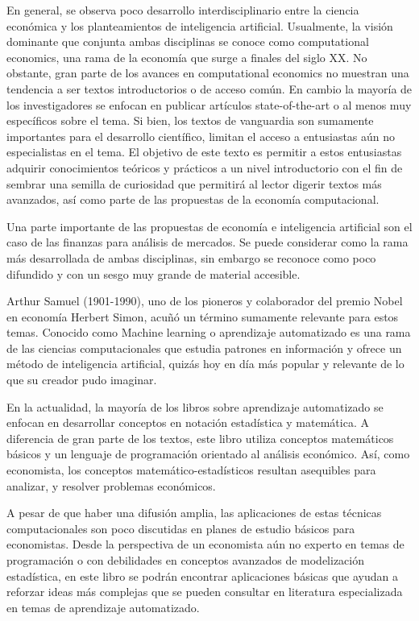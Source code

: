 \documentclass[letterpaper,12pt, spanish, oneside]{book} %
\begin{document}
En general, se observa poco desarrollo interdisciplinario entre la ciencia económica y los planteamientos de inteligencia artificial. Usualmente, la visión dominante que conjunta ambas disciplinas se conoce como computational economics, una rama de la economía que surge a finales del siglo XX. No obstante, gran parte de los avances en computational economics no muestran una tendencia a ser textos introductorios o de acceso común. En cambio la mayoría de los investigadores se enfocan en publicar artículos state-of-the-art o  al menos muy específicos sobre el tema. Si bien, los textos de vanguardia son sumamente importantes para el desarrollo científico, limitan el acceso a entusiastas aún no especialistas en el tema. El objetivo de este texto es permitir a estos entusiastas adquirir conocimientos teóricos y prácticos a un nivel introductorio con el fin de sembrar una semilla de curiosidad que permitirá al lector digerir textos más avanzados, así como parte de las propuestas de la economía computacional.

Una parte importante de las propuestas de economía e inteligencia artificial son el caso de las finanzas para análisis de mercados. Se puede considerar como la rama  más desarrollada de ambas disciplinas, sin embargo se reconoce como poco difundido y con un sesgo muy grande de material accesible.

Arthur Samuel (1901-1990), uno de los pioneros y colaborador del premio Nobel en economía Herbert Simon, acuñó un término sumamente relevante para estos temas. Conocido como  Machine learning o aprendizaje automatizado es una rama de las ciencias computacionales que estudia patrones en información y ofrece un método de inteligencia artificial, quizás hoy en día más popular y relevante de lo que su creador pudo imaginar.

En la actualidad, la mayoría de los libros sobre aprendizaje automatizado se enfocan en desarrollar conceptos en notación estadística y matemática. A diferencia de gran parte de los textos, este libro utiliza conceptos matemáticos básicos y un lenguaje de programación orientado al análisis económico. Así, como economista, los conceptos matemático-estadísticos resultan asequibles para analizar, y resolver problemas económicos.

A pesar de que haber una difusión amplia, las aplicaciones de estas técnicas computacionales son poco discutidas en planes de estudio básicos para economistas. Desde la perspectiva de un economista aún no experto en temas de programación o con debilidades en conceptos avanzados de modelización estadística, en este libro se podrán encontrar aplicaciones básicas que ayudan a reforzar ideas más complejas que se pueden consultar en literatura especializada en temas de aprendizaje automatizado.
\end{document}
